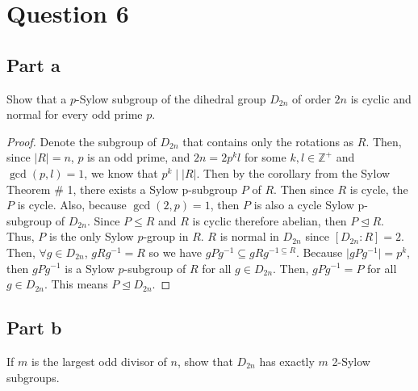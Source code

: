 \section{Question 6}

\subsection{Part a}

\begin{question}
    Show that a $p$-Sylow subgroup of the dihedral group $D_{2 n}$ of order $2 n$ is cyclic and normal for every odd prime $p$.
\end{question}

\begin{answer}
    \begin{proof}
        Denote the subgroup of $D_{2n}$ that contains only the rotations as $R$. Then, since $\lvert R \rvert = n$, $p$ is an odd prime, and $2n = 2p^kl$ for some $k,l\in \mathbb{Z}^+$ and $\gcd(p,l) = 1$, we know that $p^k \mid \lvert R \rvert$. Then by the corollary from the Sylow Theorem \# 1, there exists a Sylow p-subgroup $P$ of $R$. Then since $R$ is cycle, the $P$ is cycle. Also, because $\gcd(2,p) = 1$, then $P$ is also a cycle Sylow p-subgroup of $D_{2n}$. Since $P \leqslant R$ and $R$ is cyclic therefore abelian, then $P \trianglelefteq R$. Thus, $P$ is the only Sylow $p$-group in $R$. $R$ is normal in $D_{2n}$ since $[D_{2n}:R] = 2$. Then, $\forall g \in D_{2n}$, $gRg^{-1} = R$ so we have $gPg^{-1} \subseteq gRg^{-1 \subseteq R}$. Because $\lvert gPg^{-1} \rvert = p^k$, then $gPg^{-1}$ is a Sylow $p$-subgroup of $R$ for all $g \in D_{2n}$. Then, $gPg^{-1} = P$ for all $g \in D_{2n}$. This means $P \trianglelefteq D_{2n}$.
    \end{proof}
\end{answer}

\subsection{Part b}

\begin{question}
    If $m$ is the largest odd divisor of $n$, show that $D_{2 n}$ has exactly $m$ 2-Sylow subgroups.
\end{question}

